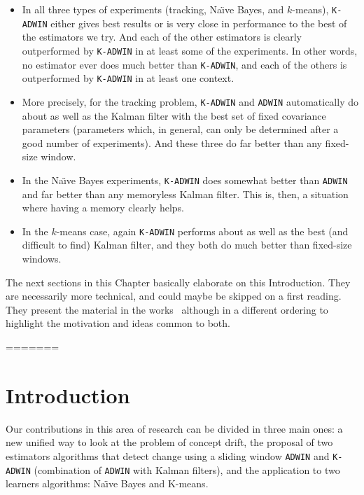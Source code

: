 \begin{itemize}
\item In all three types of experiments (tracking, Na\"\i ve Bayes, and $k$-means), 
{\tt K-ADWIN} either gives best results or is very close in performance to the best 
of the estimators we try. And each of the other estimators is 
clearly outperformed by {\tt K-ADWIN}
in at least some of the experiments. In other words, no estimator ever does
much better than {\tt K-ADWIN}, and each of the others 
is outperformed by {\tt K-ADWIN} in at least one context. 
\item More precisely, for the tracking problem, {\tt K-ADWIN} and {\tt ADWIN} automatically
do about as well as the Kalman filter with the best set of fixed covariance parameters
(parameters which, in general, can only be determined after a good number of experiments). 
And these three do far better than any fixed-size window. 
\item In the Na\"\i ve Bayes experiments, {\tt K-ADWIN} does somewhat better than
{\tt ADWIN} and far better than any memoryless Kalman filter. This is, then, 
a situation where having a memory clearly helps. 
\item In the $k$-means case, again {\tt K-ADWIN} performs about as well 
as the best (and difficult to find) Kalman filter, 
and they both do much better than fixed-size windows.
\end{itemize}
\ENDOMIT

{\change
The next sections in this Chapter basically elaborate on this Introduction. They are necessarily more technical, and could maybe be skipped on a first reading. They present the material in the works~\cite{Kbif-gav,bif-gav} %
although in a different ordering to highlight the motivation and ideas common to both.
}

=======
\section{Introduction}
\label{Introduction}

 Our contributions in this area of research %
 can be divided in three main ones: a new unified way to look at the problem of concept drift, the proposal of 
two estimators algorithms that detect change using a sliding 
window {\tt ADWIN} and {\tt K-ADWIN} (combination of {\tt ADWIN} with Kalman filters),
and the application to two learners algorithms: Na\"{\i}ve Bayes and K-means.

